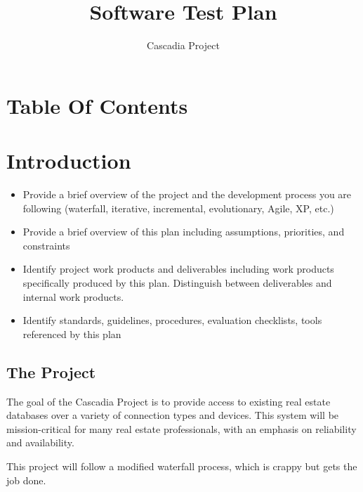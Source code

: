 \documentclass[11pt]{report}
\begin{document}
\date{Cascadia Project} 
\title{Software Test Plan} 
\maketitle


\chapter{Table Of Contents}
\tableofcontents
\clearpage


\chapter{Introduction}
\begin{itemize}
\item Provide a brief overview of the project and the development process you are following
  (waterfall, iterative, incremental, evolutionary, Agile, XP, etc.)
\item Provide a brief overview of this plan including assumptions, priorities, and constraints
\item Identify project work products and deliverables including work products specifically produced
  by this plan. Distinguish between deliverables and internal work products.
\item Identify standards, guidelines, procedures, evaluation checklists, tools referenced by this
  plan
\end{itemize}


\section{The Project}
The goal of the Cascadia Project is to provide access to existing real estate databases over a
variety of connection types and devices.  This system will be mission-critical for many real estate
professionals, with an emphasis on reliability and availability.

This project will follow a modified waterfall process, which is crappy but gets the job done.
\end{document}
